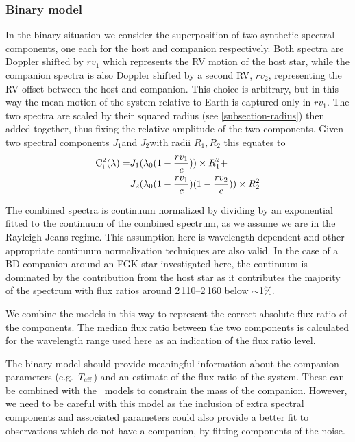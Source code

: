\subsubsection{Binary model}
\label{subsubsec:binary-model}
In the binary situation we consider the superposition of two synthetic spectral components, one each for the host and companion respectively.
Both spectra are Doppler shifted by \({rv}_1\) which represents the {RV} motion of the host star, while the companion spectra is also Doppler shifted by a second {RV}, \({rv}_2\), representing the {RV} offset between the host and companion.
This choice is arbitrary, but in this way the mean motion of the system relative to Earth is captured only in \({rv}_1\).
The two spectra are scaled by their squared radius (see \cref{subsection-radius}) then added together, thus fixing the relative amplitude of the two components.
Given two spectral components \(J_{1}\)and \(J_{2}\)with radii \(R_1, R_2\) this equates to
\begin{align}
\rm C^{2}_{i}(\lambda) = &  J_{1}(\lambda_{0}(1 - \frac{rv_{1}}{c}))\times R_{1}^2 +\nonumber \\
& J_{2}(\lambda_{0}(1-\frac{rv_{1}}{c})(1-\frac{rv_{2}}{c}))\times R_{2}^2
\end{align}


The combined spectra is continuum normalized by dividing by an exponential fitted to the continuum of the combined spectrum, as we assume we are in the Rayleigh-Jeans regime.
This assumption here is wavelength dependent and other appropriate continuum normalization techniques are also valid.
In the case of a {BD} companion around an FGK star investigated here, the continuum is dominated by the contribution from the host star as it contributes the majority of the spectrum with flux ratios around 2\,110--2\,160\nm{} below \(\sim\)1\%.

We combine the models in this way to represent the correct absolute flux ratio of the components.
The median flux ratio between the two components is calculated for the wavelength range used here as an indication of the flux ratio level.

The binary model should provide meaningful information about the companion parameters (e.g.\ \(T_{\mathrm{eff}}{}\)) and an estimate of the flux ratio of the system.
These can be combined with the~\citet{baraffe_evolutionary_2003} models to constrain the mass of the companion.
However, we need to be careful with this model as the inclusion of extra spectral components and associated parameters could also provide a better fit to observations which do not have a companion, by fitting components of the noise.\\

